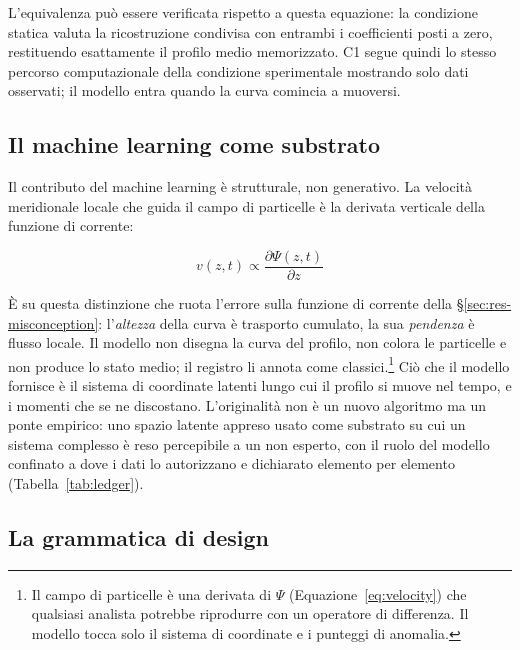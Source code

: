 L'equivalenza può essere verificata rispetto a questa equazione: la condizione statica valuta la ricostruzione condivisa con entrambi i coefficienti posti a zero, restituendo esattamente il profilo medio memorizzato. C1 segue quindi lo stesso percorso computazionale della condizione sperimentale mostrando solo dati osservati; il modello entra quando la curva comincia a muoversi.

\subsection{Il machine learning come substrato}
\label{subsec:ml-role}

Il contributo del machine learning è strutturale, non generativo. La velocità meridionale locale che guida il campo di particelle è la derivata verticale della funzione di corrente:

\begin{equation}
\label{eq:velocity}
v(z, t) \propto \frac{\partial \Psi(z, t)}{\partial z}
\end{equation}

\noindent È su questa distinzione che ruota l'errore sulla funzione di corrente della \S\ref{sec:res-misconception}: l'\emph{altezza} della curva è trasporto cumulato, la sua \emph{pendenza} è flusso locale. Il modello non disegna la curva del profilo, non colora le particelle e non produce lo stato medio; il registro li annota come classici.\footnote{Il campo di particelle è una derivata di $\Psi$ (Equazione~\ref{eq:velocity}) che qualsiasi analista potrebbe riprodurre con un operatore di differenza. Il modello tocca solo il sistema di coordinate e i punteggi di anomalia.} Ciò che il modello fornisce è il sistema di coordinate latenti lungo cui il profilo si muove nel tempo, e i momenti che se ne discostano. L'originalità non è un nuovo algoritmo ma un ponte empirico: uno spazio latente appreso usato come substrato su cui un sistema complesso è reso percepibile a un non esperto, con il ruolo del modello confinato a dove i dati lo autorizzano e dichiarato elemento per elemento (Tabella~\ref{tab:ledger}).

\subsection{La grammatica di design}
\label{subsec:grammar}

